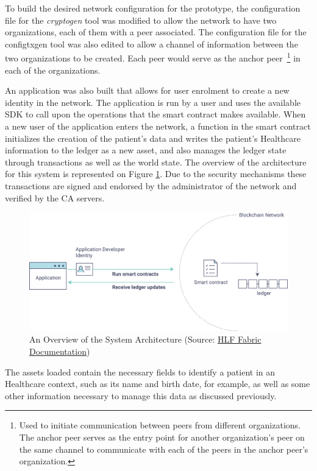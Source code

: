 To build the desired network configuration for the prototype, the configuration
file for the \textit{cryptogen} tool was modified to allow the network to have
two organizations, each of them with a peer associated. The configuration file
for the configtxgen tool was also edited to allow a channel of information
between the two organizations to be created. Each peer would serve as the
anchor peer~\footnote{Used to initiate communication between peers from
different organizations. The anchor peer serves as the entry point for another
organization’s peer on the same channel to communicate with each of the peers
in the anchor peer’s organization.} in each of the organizations.

An application was also built that allows for user enrolment to create a new
identity in the network. The application is run by a user and uses the
available SDK to call upon the operations that the smart contract makes
available. When a new user of the application enters the network, a function in
the smart contract initializes the creation of the patient's data and writes
the patient's Healthcare information to the ledger as a new asset, and also
manages the ledger state through transactions as well as the world state. The
overview of the architecture for this system is represented on Figure
\ref{fig:appOverview}. Due to the security mechanisms these transactions are
signed and endorsed by the administrator of the network and verified by the CA
servers.

\begin{figure}[ht] \centering
  \includegraphics[width=0.83\linewidth]{imgs/hyperledgerAppOverview.png}
  \caption{\label{fig:appOverview}An Overview of the System Architecture
  (Source:
  \href{http://hyperledger-fabric.readthedocs.io/en/latest/write_first_app.html}{HLF
  Fabric Documentation})} 
\end{figure}

The assets loaded contain the necessary fields to identify a patient in an
Healthcare context, such as its name and birth date, for example, as well as
some other information necessary to manage this data as discussed previously.


